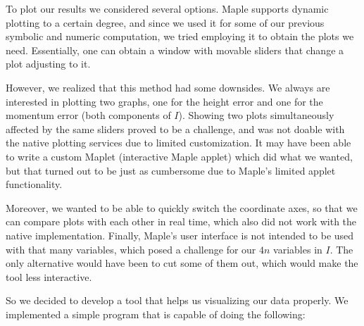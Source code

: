 \documentclass{article}
\begin{document}
To plot our results we considered several options. Maple supports dynamic plotting to a certain degree, and since we used it for some of our previous symbolic and numeric computation, we tried employing it to obtain the plots we need. Essentially, one can obtain a window with movable sliders that change a plot adjusting to it.

However, we realized that this method had some downsides. We always are interested in plotting two graphs, one for the height error and one for the momentum error (both components of $I$). Showing two plots simultaneously affected by the same sliders proved to be a challenge, and was not doable with the native plotting services due to limited customization. It may have been able to write a custom Maplet (interactive Maple applet) which did what we wanted, but that turned out to be just as cumbersome due to Maple's limited applet functionality.

Moreover, we wanted to be able to quickly switch the coordinate axes, so that we can compare plots with each other in real time, which also did not work with the native implementation. Finally, Maple's user interface is not intended to be used with that many variables, which posed a challenge for our $4n$ variables in $I$. The only alternative would have been to cut some of them out, which would make the tool less interactive.

So we decided to develop a tool that helps us visualizing our data properly. We implemented a simple program that is capable of doing the following:
\end{document}
